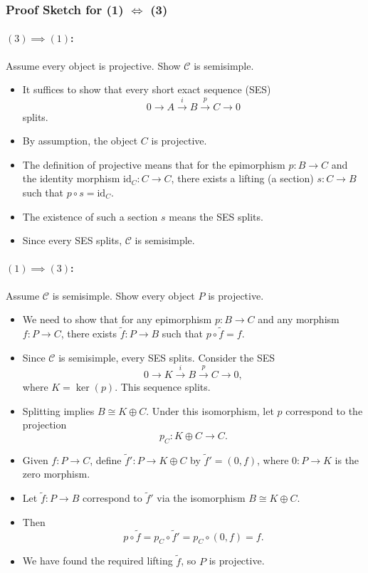 \documentclass[11pt]{article}
\theoremstyle{definition}
\begin{document}
\subsubsection*{Proof Sketch for (1) \(\iff\) (3)}

\paragraph{\((3) \implies (1)\):} Assume every object is projective. Show \(\mathcal{C}\) is semisimple.
\begin{itemize}
    \item It suffices to show that every short exact sequence (SES) 
    \[
    0 \to A \xrightarrow{i} B \xrightarrow{p} C \to 0
    \]
    splits.
    \item By assumption, the object \(C\) is projective.
    \item The definition of projective means that for the epimorphism \(p: B \to C\) and the identity morphism \(\mathrm{id}_C: C \to C\), there exists a lifting (a section) \(s: C \to B\) such that \(p \circ s = \mathrm{id}_C\).
    \item The existence of such a section \(s\) means the SES splits.
    \item Since every SES splits, \(\mathcal{C}\) is semisimple.
\end{itemize}

\paragraph{\((1) \implies (3)\):} Assume \(\mathcal{C}\) is semisimple. Show every object \(P\) is projective.
\begin{itemize}
    \item We need to show that for any epimorphism \(p: B \to C\) and any morphism \(f: P \to C\), there exists \(\tilde{f}: P \to B\) such that \(p \circ \tilde{f} = f\).
    \item Since \(\mathcal{C}\) is semisimple, every SES splits. Consider the SES
    \[
    0 \to K \xrightarrow{i} B \xrightarrow{p} C \to 0,
    \]
    where \(K = \ker(p)\). This sequence splits.
    \item Splitting implies \(B \cong K \oplus C\). Under this isomorphism, let \(p\) correspond to the projection
    \[
    p_C: K \oplus C \to C.
    \]
    \item Given \(f: P \to C\), define \(\tilde{f}': P \to K \oplus C\) by \(\tilde{f}' = (0, f)\), where \(0: P \to K\) is the zero morphism.
    \item Let \(\tilde{f}: P \to B\) correspond to \(\tilde{f}'\) via the isomorphism \(B \cong K \oplus C\).
    \item Then
    \[
    p \circ \tilde{f} = p_C \circ \tilde{f}' = p_C \circ (0, f) = f.
    \]
    \item We have found the required lifting \(\tilde{f}\), so \(P\) is projective.
\end{itemize}
\end{document}
